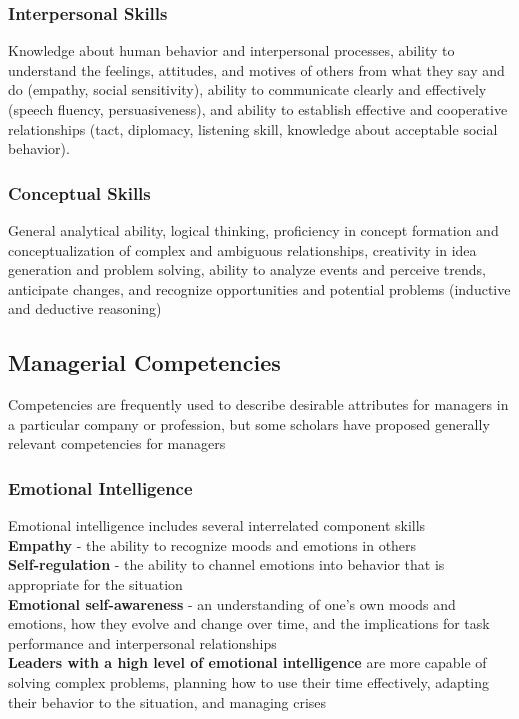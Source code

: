 
\subsubsection{Interpersonal Skills} %
\label{ssub:interpersonal}
	Knowledge about human behavior and interpersonal processes, ability to understand the feelings, attitudes, and motives of others from what they say and do (empathy, social sensitivity), ability to communicate clearly and effectively (speech fluency, persuasiveness), and ability to establish effective and cooperative relationships (tact, diplomacy, listening skill, knowledge about acceptable social behavior).


\subsubsection{Conceptual Skills} %
\label{ssub:conceptual_skills}
	General analytical ability, logical thinking, proficiency in concept formation and conceptualization of complex and ambiguous relationships, creativity in idea generation and problem solving, ability to analyze events and perceive trends, anticipate changes, and recognize opportunities and potential problems (inductive and deductive reasoning)



\subsection{Managerial Competencies} %
\label{sub:managerial_competencies}
	Competencies are frequently used to describe desirable attributes for managers in a particular company or profession, but some scholars have proposed generally relevant competencies for managers

\subsubsection{Emotional Intelligence} %
\label{ssub:emotional_intelligence}
Emotional intelligence includes several interrelated component skills
	\\ \textbf{Empathy} - the ability to recognize moods and emotions in others
	\\ \textbf{Self-regulation} - the ability to channel emotions into behavior that is appropriate for the situation
	\\ \textbf{Emotional self-awareness} - an understanding of one’s own moods and emotions, how they evolve and change over time, and the implications for task performance and interpersonal relationships
	\\ \textbf{Leaders with a high level of emotional intelligence} are more capable of solving complex problems, planning how to use their time effectively, adapting their behavior to the situation, and managing crises

